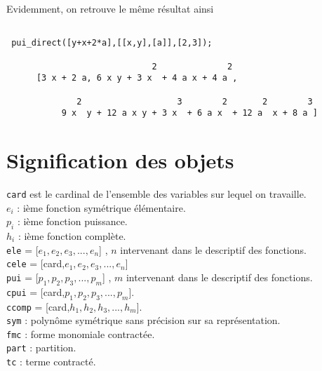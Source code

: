 \documentclass[11pt]{article}
\begin{document}
\normalsize
Evidemment, on retrouve le m\^eme r\'esultat ainsi 
\small
\begin{verbatim}

 pui_direct([y+x+2*a],[[x,y],[a]],[2,3]);

                             2              2
      [3 x + 2 a, 6 x y + 3 x  + 4 a x + 4 a , 

              2                   3        2       2        3
           9 x  y + 12 a x y + 3 x  + 6 a x  + 12 a  x + 8 a ]
\end{verbatim}
\normalsize
\newpage
\section*{Signification des objets }

{\tt card}
 est le cardinal de l'ensemble des variables sur lequel on travaille.\\

{\tt $e_i$} : i\`{e}me fonction sym\'{e}trique \'{e}l\'{e}mentaire.\\

{\tt $p_i$} : i\`{e}me fonction puissance.\\

{\tt $h_i$} : i\`{e}me fonction compl\`ete.\\

{\tt ele} = [$e_{1},e_{2},e_{3},...,e_{n}$] , $n$ intervenant dans le
descriptif des fonctions.\\

{\tt cele} = [card,$e_{1},e_{2},e_{3},...,e_{n}$]\\

{\tt pui} = [$p_{1},p_{2},p_{3},...,p_{m}$] , $m$ intervenant dans le
descriptif des fonctions.\\

{\tt cpui} = [card,$p_{1},p_{2},p_{3},...,p_{m}$].\\

{\tt ccomp} = [card,$h_{1},h_{2},h_{3},...,h_{m}$].\\

{\tt sym} :  polyn\^{o}me sym\'{e}trique sans pr\'{e}cision sur
sa repr\'{e}sentation.\\

{\tt fmc} :  forme monomiale contract\'{e}e.\\

{\tt part} :  partition.\\

{\tt tc} :  terme contract\'{e}.\\
\end{document}

